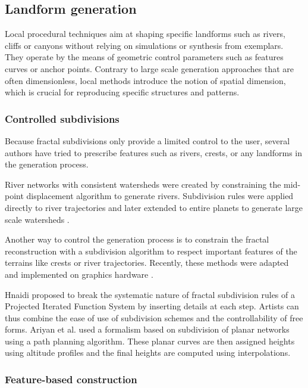 \documentclass{article}
\begin{document}
\subsection{Landform generation}

Local procedural techniques aim at shaping specific landforms such as rivers, cliffs or canyons without relying on simulations or synthesis from exemplars. They operate by the means of geometric control parameters such as features curves or anchor points. Contrary to large scale generation approaches that are often dimensionless, local methods introduce the notion of spatial dimension, which is crucial for reproducing specific structures and patterns.

\subsubsection{Controlled subdivisions}

Because fractal subdivisions only provide a limited control to the user, several authors have tried to prescribe features such as rivers, crests, or any landforms in the generation process.

River networks with consistent watersheds were created by constraining the mid-point displacement algorithm \cite{KMN88} to generate rivers. Subdivision rules were applied directly to river trajectories \cite{PH93} and later extended to entire planets to generate large scale watersheds \cite{DGGK11}.

Another way to control the generation process is to constrain the fractal reconstruction \cite{Bel07, BA05a, BA05b} with a subdivision algorithm to respect important features of the terrains like crests or river trajectories. Recently, these methods were adapted and implemented on graphics hardware \cite{TB18}.

Hnaidi \cite{HGA10a} proposed to break the systematic nature of fractal subdivision rules of a Projected Iterated Function System by inserting details at each step. Artists can thus combine the ease of use of subdivision schemes and the controllability of free forms. Ariyan et al. \cite{AM15} used a formalism based on subdivision of planar networks using a path planning algorithm. These planar curves are then assigned heights using altitude profiles and the final heights are computed using interpolations.

\subsubsection{Feature-based construction}
\end{document}
